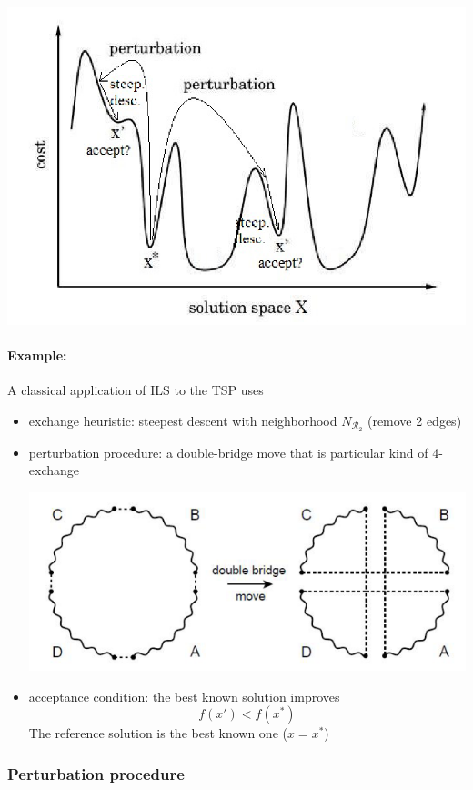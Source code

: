 \documentclass[11pt]{article}
\begin{document}
	\begin{center}
		\includegraphics[width=0.7\columnwidth]{img/ILS1}
	\end{center}
	
	\vfill
	
	\paragraph{Example:} A classical application of ILS to the TSP uses
	\begin{itemize}
		\item exchange heuristic: steepest descent with neighborhood $N_{\mathcal{R}_2}$ (remove 2 edges)
		
		\item perturbation procedure: a double-bridge move that is particular kind of 4-exchange
		\begin{center}
			\includegraphics[width=0.6\columnwidth]{img/TSP5}
		\end{center}
		
		\item acceptance condition: the best known solution improves 
		$$f (x') < f (x^\ast)$$
		The reference solution is the best known one ($x = x^\ast$)
	\end{itemize}
	
	\newpage
	
	\subsubsection{Perturbation procedure}
	
\end{document}
